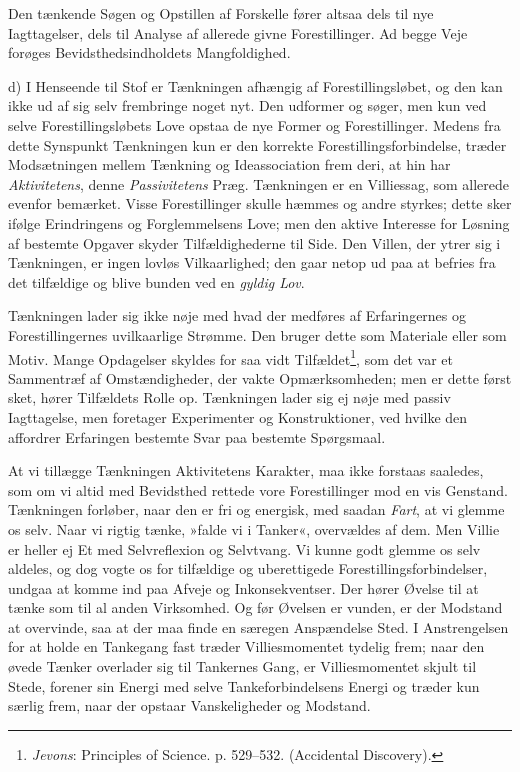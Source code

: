 \documentclass[12pt,a4paper,openany]{book}
\newcommand{\opage}[1]{\marginnote{\footnotesize\textit{[#1]}}}
\begin{document}
Den tænkende Søgen og Opstillen af Forskelle fører altsaa dels til nye
Iagttagelser, dels til Analyse af allerede givne Forestillinger. Ad
begge Veje forøges Bevidsthedsindholdets Mangfoldighed.

d) I Henseende til Stof er Tænkningen afhængig af Forestillingsløbet, og
den kan ikke ud af sig selv frembringe noget nyt. Den udformer og søger,
men kun ved selve Forestillingsløbets Love opstaa de nye Former og
Forestillinger. Medens fra dette Synspunkt Tænkningen kun er den
korrekte Forestillingsforbindelse, træder Modsætningen mellem Tænkning
og Ideassociation frem deri, at hin har \emph{Aktivitetens}, denne
\emph{Passivitetens} Præg. Tænkningen er en Villiessag, som allerede
evenfor bemærket. Visse Forestillinger skulle hæmmes og andre styrkes;
dette sker ifølge Erindringens og Forglemmelsens Love; men den aktive
Interesse for Løsning af bestemte Opgaver skyder Tilfældighederne til
Side. Den Villen, der ytrer sig i Tænkningen, er ingen lovløs
Vilkaarlighed; den gaar netop ud paa at befries fra det tilfældige og
blive bunden ved en \emph{gyldig Lov}.

Tænkningen lader sig ikke nøje med hvad der medføres af Erfaringernes og
Forestillingernes uvilkaarlige Strømme. Den bruger dette som Materiale
eller som Motiv. Mange Opdagelser skyldes for saa vidt
Tilfældet\footnote[2]{\emph{Jevons}: Principles of Science. p. 529--532.
(Accidental Discovery).}, som det var et Sammentræf af Omstændigheder,
der vakte Opmærksomheden; men er dette først sket, hører Tilfældets
Rolle op. Tænkningen lader sig ej nøje med passiv Iagttagelse, men
foretager Experimenter og Konstruktioner, ved hvilke den affordrer
Erfaringen bestemte Svar paa bestemte Spørgsmaal.

At vi tillægge Tænkningen Aktivitetens Karakter, maa ikke forstaas
saaledes, som om vi altid med Bevidsthed rettede vore Forestillinger mod
en vis Genstand. Tænkningen forløber, naar den er fri og energisk, med
saadan \emph{Fart}, at vi
\opage{221}glemme os selv. Naar vi rigtig tænke, »falde vi i Tanker«,
overvældes af dem. Men Villie er heller ej Et med Selvreflexion og
Selvtvang. Vi kunne godt glemme os selv aldeles, og dog vogte os for
tilfældige og uberettigede Forestillingsforbindelser, undgaa at komme
ind paa Afveje og Inkonsekventser. Der hører Øvelse til at tænke som til
al anden Virksomhed. Og før Øvelsen er vunden, er der Modstand at
overvinde, saa at der maa finde en særegen Anspændelse Sted. I
Anstrengelsen for at holde en Tankegang fast træder Villiesmomentet
tydelig frem; naar den øvede Tænker overlader sig til Tankernes Gang, er
Villiesmomentet skjult til Stede, forener sin Energi med selve
Tankeforbindelsens Energi og træder kun særlig frem, naar der opstaar
Vanskeligheder og Modstand.
\end{document}
